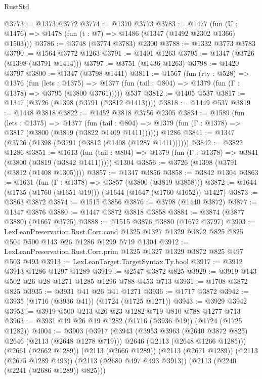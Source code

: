 \begin{lexlean}{RustStd}
\begin{coremodule}
@3773 := @1373 @3772
@3774 := @1370 @3773
@3783 := @1477 (fun (U : @1476) => @1478 (fun (t : @7) => @1486 (@1347 (@1492 @2302 @1366) @1503)))
@3786 := @3748 (@3774 @3783) @2300
@3788 := @1332 @3773 @3783
@3790 := @1564 @3772 @1263
@3791 := @1401 @1263
@3795 := @1347 (@3726 (@1398 (@3791 @1414)))
@3797 := @3751 (@1436 @1263)
@3798 := @1420 @3797
@3800 := @1347 (@3798 @1441)
@3811 := @1567
    (fun (rty : @528) =>
    @1376
      (fun (lets : @1375) =>
      @1377 (fun (tail : @804) => @1379 (fun (Γ : @1378) => @3795 (@3800 @3761)))))
    @537
@3812 := @1405 @537
@3817 := @1347 (@3726 (@1398 (@3791 (@3812 @1413))))
@3818 := @1449 @537
@3819 := @1448 @3818
@3822 := @1452 @3818 @3756 @2305
@3834 := @1589
    (fun (lets : @1375) =>
    @1377
      (fun (tail : @804) => @1379 (fun (Γ : @1378) => @3817 (@3800 (@3819 (@3822 @1409 @1411))))))
    @1286
@3841 := @1347 (@3726 (@1398 (@3791 (@3812 (@1408 (@1287 @1411))))))
@3842 := @3822 @1286
@3851 := @1613
    (fun (tail : @804) => @1379 (fun (Γ : @1378) => @3841 (@3800 (@3819 (@3842 @1411)))))
    @1304
@3856 := @3726 (@1398 (@3791 (@3812 (@1408 @1305))))
@3857 := @1347 @3856
@3858 := @3842 @1304
@3863 := @1631 (fun (Γ : @1378) => @3857 (@3800 (@3819 @3858)))
@3872 := @1644 (@1735 (@1760 (@1651 @19))) (@1644 (@1647 (@1760 @1652)) @1427)
@3873 := @3863 @3872
@3874 := @1515 @3856
@3876 := @3798 (@1440 @3872)
@3877 := @1347 @3876
@3880 := @1447 @3872 @3818 @3858
@3884 := @3874 (@3877 @3880) (@1667 @3725)
@3888 := @1515 @3876 @3880 (@1672 @3797)
@3903 := LexLeanPreservation.Rust.Corr.cond
    @1325
    @1327
    @1329
    @3872
    @825
    @825
    @504
    @500
    @143
    @26
    @1286
    @1299
    @719
    @1304
@3912 := LexLeanPreservation.Rust.Corr.prim @1325 @1327 @1329 @3872 @825 @497 @503 @493
@3913 := LexLeanTarget.TargetSyntax.Ty.bool
@3917 := @3912 @3913 @1286 @1297 @1289
@3919 := @2547 @3872 @825
@3929 := @3919 @143 @502 @26 @28 @1271 @1285 @1296 @788 @453 @713
@3931 := @1708 @3872 @825
@3935 := @3931 @41 @26 @41 @1271
@3936 := @1717 @3872
@3942 := @3935 (@1716 (@3936 @41)) (@1724 (@1725 @1271))
@3943 := @3929 @3942
@3953 := @3919 @500 @213 @26 @23 @1282 @719 @810 @788 @1277 @713
@3963 := @3931 @19 @26 @19 @1282 (@1716 (@3936 @19)) (@1724 (@1725 @1282))
@4004 := @3903
    (@3917
      (@3943
        (@3953 @3963 (@2640 @3872 @825) @2646 (@2113 (@2648 @1278 @719)))
        @2646
        (@2113 (@2648 @1266 @1285)))
      (@2661 (@2662 @1289))
      (@2113 (@2666 @1289))
      (@2113 (@2671 @1289))
      (@2113 (@2675 @1289 @493))
      (@2113 (@2680 @497 @493 @3913))
      (@2113 (@2240 (@2241 (@2686 @1289)) @825)))

\end{coremodule}
\end{lexlean}
